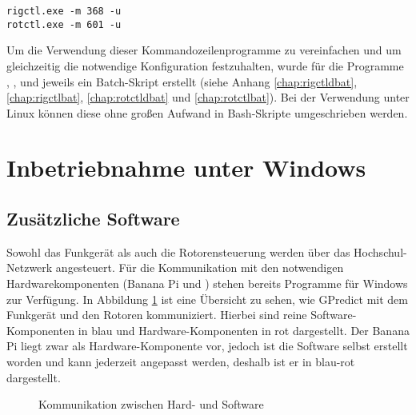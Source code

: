 \vspace{-1em}
\begin{shaded}
	\texttt{rigctl.exe -m 368 -u}\\
	\texttt{rotctl.exe -m 601 -u}
\end{shaded}
\vspace{-1em}

Um die Verwendung dieser Kommandozeilenprogramme zu vereinfachen und um gleichzeitig die notwendige Konfiguration festzuhalten, wurde für die Programme , ,  und  jeweils ein Batch-Skript erstellt (siehe Anhang \ref{chap:rigctldbat}, \ref{chap:rigctlbat}, \ref{chap:rotctldbat} und \ref{chap:rotctlbat}). Bei der Verwendung unter Linux können diese ohne großen Aufwand in Bash-Skripte umgeschrieben werden. 

\clearpage

\section{Inbetriebnahme unter Windows}

\subsection{Zusätzliche Software}
\label{chap:software}

Sowohl das Funkgerät als auch die Rotorensteuerung werden über das Hochschul-Netzwerk angesteuert. Für die Kommunikation mit den notwendigen Hardwarekomponenten (Banana Pi und ) stehen bereits Programme für Windows zur Verfügung. In Abbildung \ref{fig:swhwcom} ist eine Übersicht zu sehen, wie GPredict mit dem Funkgerät und den Rotoren kommuniziert. Hierbei sind reine Software-Komponenten in blau und Hardware-Komponenten in rot dargestellt. Der Banana Pi liegt zwar als Hardware-Komponente vor, jedoch ist die Software selbst erstellt worden und kann jederzeit angepasst werden, deshalb ist er in blau-rot dargestellt.

\begin{figure}[h]
	\centering
	
	\caption{Kommunikation zwischen Hard- und Software}
	\label{fig:swhwcom} 
\end{figure}

